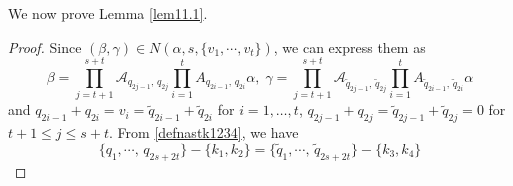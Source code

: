 \documentclass[11pt]{article}
\numberwithin{equation}{section}
\newcommand{\beq}{\begin{equation}}
\newcommand{\eeq}{\end{equation}}
\newcommand\al{{\alpha}}
\newcommand\be{\beta}
\theoremstyle{definition}
\begin{document}
We now prove Lemma \ref{lem11.1}.
\begin{proof}
Since  $(\beta,\gamma)\in N(\al, s, \{v_1,\cdots, v_t\})$, we can express them as  
\beq\label{112}
\be =\prod_{j=t+1}^{s+t}\mathcal A_{ q_{2j-1},\, q_{2j}}\prod_{i=1}^{t}A_{ q_{2i-1},\, q_{2i}}\al,  \; \gamma=\prod_{j=t+1}^{s+t}\mathcal A_{\widetilde q_{2j-1},\,\widetilde q_{2j}}\prod_{i=1}^{t}A_{\widetilde q_{2i-1},\,\widetilde q_{2i}}\al
\eeq
and $ q_{2i-1}+ q_{2i} = v_i = \widetilde q_{2i-1} + \widetilde q_{2i}$ for $i=1, \ldots, t$, $q_{2j-1}+ q_{2j}= \widetilde q_{2j-1} + \widetilde q_{2j}=0$ for $t+1\leq j\leq s+t$. 
{F}rom \eqref{defnastk1234}, we have 
 \beq
 \{q_1,\cdots,\,q_{2s+2t}\}-\{k_1,k_2\}=\{\widetilde q_1,\cdots,\,\widetilde q_{2s+2t}\}-\{k_3,k_4\}
 \eeq


\end{proof}
\end{document}
